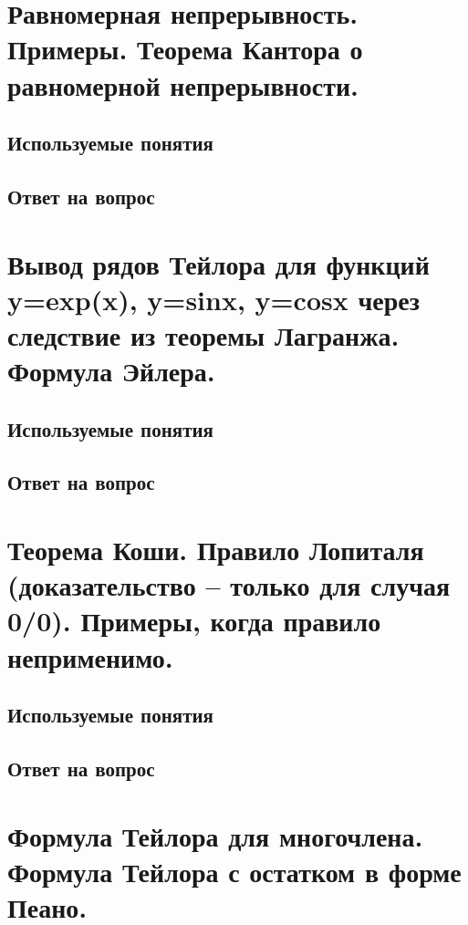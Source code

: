 \documentclass[12pt,a4paper]{article}
\begin{document}
\newpage
\section{Равномерная непрерывность. Примеры. Теорема Кантора о равномерной непрерывности.}

\subsection{Используемые понятия}


\subsection{Ответ на вопрос}


\newpage
\section{Вывод рядов Тейлора для функций y=exp(x), y=sinx, y=cosx через следствие из теоремы Лагранжа. Формула Эйлера.}

\subsection{Используемые понятия}


\subsection{Ответ на вопрос}


\newpage
\section{Теорема Коши. Правило Лопиталя (доказательство – только для случая 0/0). Примеры, когда правило неприменимо.}

\subsection{Используемые понятия}


\subsection{Ответ на вопрос}


\newpage
\section{Формула Тейлора для многочлена. Формула Тейлора с остатком в форме Пеано.}
\end{document}
